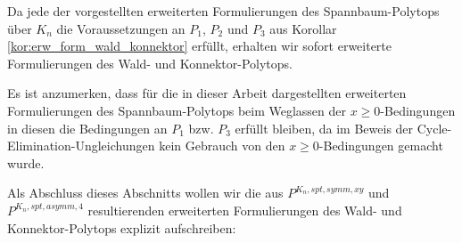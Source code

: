 \documentclass[10p,a4paper,BCOR = 12mm, DIV=15]{scrbook}
\begin{document}
{Da jede der vorgestellten erweiterten Formulierungen des Spannbaum-Polytops über $K_n$ die Voraussetzungen an $P_1$, $P_2$ und $P_3$ aus Korollar \ref{kor:erw_form_wald_konnektor} erfüllt, erhalten wir sofort erweiterte Formulierungen des Wald- und Konnektor-Polytops.

Es ist anzumerken, dass für die in dieser Arbeit dargestellten erweiterten Formulierungen des Spannbaum-Polytops beim Weglassen der $x \geq 0$-Bedingungen in diesen die Bedingungen an $P_1$ bzw. $P_3$ erfüllt bleiben, da im Beweis der Cycle-Elimination-Ungleichungen kein Gebrauch von den $x \geq 0$-Bedingungen gemacht wurde.

Als Abschluss dieses Abschnitts wollen wir die aus $P^{K_n, spt, symm, xy}$ und $P^{K_n, spt, asymm, 4}$ resultierenden erweiterten Formulierungen des Wald- und Konnektor-Poly\-tops explizit aufschreiben:

}
\end{document}
